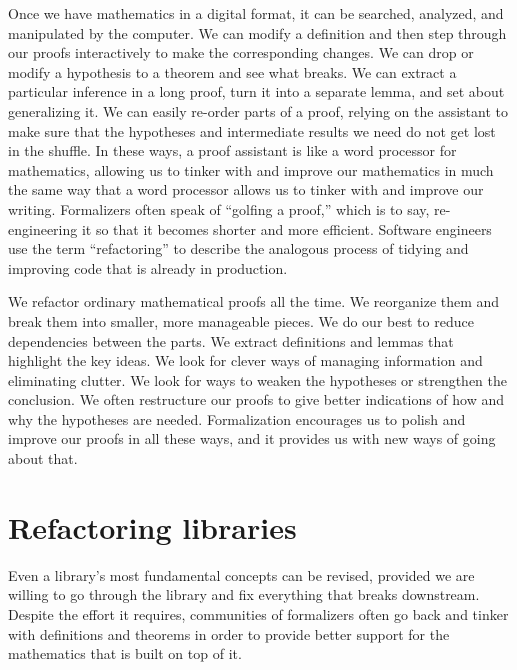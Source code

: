 \documentclass{amsart}
\theoremstyle{definition}
\theoremstyle{remark}
\numberwithin{equation}{section}
\begin{document}
Once we have mathematics in a digital format, it can be searched, analyzed, and manipulated by the computer. We can modify a definition and then step through our proofs interactively to make the corresponding changes. We can drop or modify a hypothesis to a theorem and see what breaks. We can extract a particular inference in a long proof, turn it into a separate lemma, and set about generalizing it. We can easily re-order parts of a proof, relying on the assistant to make sure that the hypotheses and intermediate results we need do not get lost in the shuffle. In these ways, a proof assistant is like a word processor for mathematics, allowing us to tinker with and improve our mathematics in much the same way that a word processor allows us to tinker with and improve our writing. Formalizers often speak of ``golfing a proof,'' which is to say, re-engineering it so that it becomes shorter and more efficient. Software engineers use the term ``refactoring'' to describe the analogous process of tidying and improving code that is already in production.

We refactor ordinary mathematical proofs all the time. We reorganize them and break them into smaller, more manageable pieces. We do our best to reduce dependencies between the parts. We extract definitions and lemmas that highlight the key ideas. We look for clever ways of managing information and eliminating clutter. We look for ways to weaken the hypotheses or strengthen the conclusion. We often restructure our proofs to give better indications of how and why the hypotheses are needed. Formalization encourages us to polish and improve our proofs in all these ways, and it provides us with new ways of going about that.


\section{Refactoring libraries}

Even a library's most fundamental concepts can be revised, provided we are willing to go through the library and fix everything that breaks downstream. Despite the effort it requires, communities of formalizers often go back and tinker with definitions and theorems in order to provide better support for the mathematics that is built on top of it.
\end{document}
